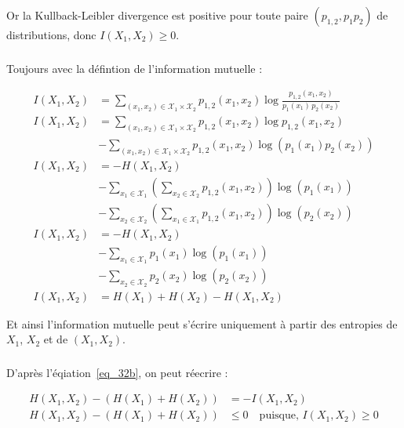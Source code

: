 \documentclass[12pt,a4paper,onecolumn]{article}
\begin{document}
Or la Kullback-Leibler divergence est positive pour toute paire \((p_{1, 2}, p_1p_2)\) de distributions, donc \(I(X_1, X_2) \geq 0\).

\subsubsection{}

Toujours avec la défintion de l'information mutuelle :

\begin{equation}
	\begin{split}
		I(X_1, X_2) &= \sum_{(x_1,x_2)\in\mathcal{X}_1\times\mathcal{X}_2} p_{1, 2}(x_1,x_2) \log \frac{p_{1, 2}(x_1,x_2)}{p_1(x_1)\,p_2(x_2)}\\
		I(X_1, X_2) &= \sum_{(x_1,x_2)\in\mathcal{X}_1\times\mathcal{X}_2} p_{1, 2}(x_1,x_2) \log p_{1, 2}(x_1,x_2)\\ &- \sum_{(x_1,x_2)\in\mathcal{X}_1\times\mathcal{X}_2} p_{1, 2}(x_1,x_2) \log \left(p_1(x_1)p_2(x_2)\right)\\
		I(X_1, X_2) &= -H(X_1, X_2)\\
		&- \sum_{x_1 \in\mathcal{X}_1} \left(\sum_{x_2 \in\mathcal{X}_2}p_{1, 2}(x_1,x_2)\right) \log \left(p_1(x_1)\right)\\
		&- \sum_{x_2 \in\mathcal{X}_2} \left(\sum_{x_1 \in\mathcal{X}_1}p_{1, 2}(x_1,x_2)\right) \log \left(p_2(x_2)\right)\\
		I(X_1, X_2) &= -H(X_1, X_2)\\
		&- \sum_{x_1 \in\mathcal{X}_1} p_{1}(x_1) \log \left(p_1(x_1)\right)\\
		&- \sum_{x_2 \in\mathcal{X}_2} p_{2}(x_2) \log \left(p_2(x_2)\right)\\
		I(X_1, X_2) &= H(X_1) + H(X_2) - H(X_1, X_2)
	\end{split}
	\label{eq_32b}
\end{equation}

Et ainsi l'information mutuelle peut s'écrire uniquement à partir des entropies de \(X_1\), \(X_2\) et de \((X_1, X_2)\).

\subsubsection{}

D'après l'éqiation~\eqref{eq_32b}, on peut réecrire :

\begin{equation}
	\begin{split}
		H(X_1, X_2) - \left(H(X_1) + H(X_2)\right) &=  - I(X_1, X_2)\\
		H(X_1, X_2) - \left(H(X_1) + H(X_2)\right) &\leq 0 \quad \text{puisque},\, I(X_1, X_2) \geq 0
	\end{split}
	\label{eq_32c}
\end{equation}
\end{document}
